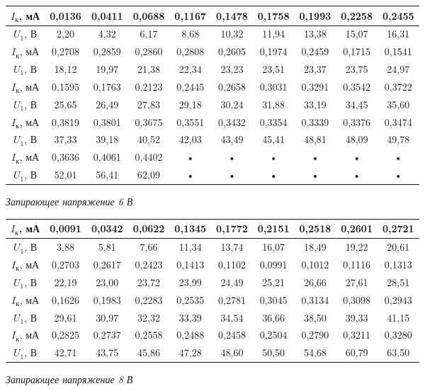 \documentclass[12pt,a4paper]{article}
\begin{document}
\begin{tabular}{|c|c|c|c|c|c|c|c|c|c|}
\hline 
$I_\text{к}$, мА & 0,0136 & 0,0411 & 0,0688 & 0,1167 & 0,1478 & 0,1758 & 0,1993 & 0,2258 & 0,2455 \\ 
\hline 
$U_1$, В & 2,20 & 4,32 & 6,17 & 8,68 & 10,32 & 11,94 & 13,38 & 15,07 & 16,31 \\ 
\hline 
$I_\text{к}$, мА & 0,2708 & 0,2859 & 0,2860 & 0,2808 & 0,2605 & 0,1974 & 0,2459 & 0,1715 & 0,1541 \\ 
\hline 
$U_1$, В & 18,12 & 19,97 & 21,38 & 22,34 & 23,23 & 23,51 & 23,37 & 23,75 & 24,97 \\ 
\hline 
$I_\text{к}$, мА & 0,1595 & 0,1763 & 0,2123 & 0,2445 & 0,2658 & 0,3031 & 0,3291 & 0,3542 & 0,3722 \\ 
\hline 
$U_1$, В & 25,65 & 26,49 & 27,83 & 29,18 & 30,24 & 31,88 & 33,19 & 34,45 & 35,60 \\ 
\hline 
$I_\text{к}$, мА & 0,3819 & 0,3801 & 0,3675 & 0,3551 & 0,3432 & 0,3354 & 0,3339 & 0,3376 & 0,3474 \\ 
\hline 
$U_1$, В & 37,33 & 39,18 & 40,52 & 42,03 & 43,49 & 45,41 & 48,81 & 48,09 & 49,78 \\ 
\hline 
$I_\text{к}$, мА & 0,3636 & 0,4061 & 0,4402 & • & • & • & • & • & • \\ 
\hline 
$U_1$, В & 52,01 & 56,41 & 62,09 & • & • & • & • & • & • \\ 
\hline 
\end{tabular} 
\begin{center}
\textit{Запирающее напряжение 6 В}
\end{center}

\begin{tabular}{|c|c|c|c|c|c|c|c|c|c|}
\hline 
$I_\text{к}$, мА & 0,0091 & 0,0342 & 0,0622 & 0,1345 & 0,1772 & 0,2151 & 0,2518 & 0,2601 & 0,2721 \\ 
\hline 
$U_1$, В & 3,88 & 5,81 & 7,66 & 11,34 & 13,74 & 16,07 & 18,49 & 19,22 & 20,61 \\ 
\hline 
$I_\text{к}$, мА & 0,2703 & 0,2617 & 0,2423 & 0,1413 & 0,1102 & 0,0991 & 0,1012 & 0,1116 & 0,1313 \\ 
\hline 
$U_1$, В & 22,19 & 23,00 & 23,72 & 23,99 & 24,49 & 25,21 & 26,66 & 27,61 & 28,51 \\ 
\hline 
$I_\text{к}$, мА & 0,1626 & 0,1983 & 0,2283 & 0,2535 & 0,2781 & 0,3045 & 0,3134 & 0,3098 & 0,2943 \\ 
\hline 
$U_1$, В & 29,61 & 30,97 & 32,32 & 33,39 & 34,54 & 36,66 & 38,50 & 39,33 & 41,15 \\ 
\hline 
$I_\text{к}$, мА & 0,2825 & 0,2737 & 0,2558 & 0,2488 & 0,2458 & 0,2504 & 0,2790 & 0,3211 & 0,3280 \\ 
\hline 
$U_1$, В & 42,71 & 43,75 & 45,86 & 47,28 & 48,60 & 50,50 & 54,68 & 60,79 & 63,50 \\ 
\hline 
\end{tabular} 
\begin{center}
\textit{Запирающее напряжение 8 В}
\end{center}
\end{document}
